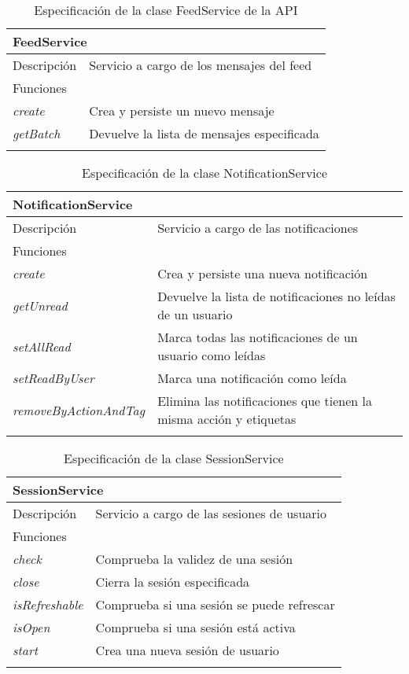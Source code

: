 \begin{longtable}{|p{} p{}|}
    \hline
    \multicolumn{2}{|l|}{FeedService} \\ \hline \hline
    Descripción      & Servicio a cargo de los mensajes del feed \\ \hline
    \multicolumn{2}{|l|}{Funciones} \\
    \emph{create}  & Crea y persiste un nuevo mensaje  \\
    \emph{getBatch}  & Devuelve la lista de mensajes especificada  \\ \hline
    \caption{Especificación de la clase FeedService de la API}
    \label{class:api:feed_service}
\end{longtable}

\begin{longtable}{|p{} p{}|}
    \hline
    \multicolumn{2}{|l|}{NotificationService} \\ \hline \hline
    Descripción      & Servicio a cargo de las notificaciones \\ \hline
    \multicolumn{2}{|l|}{Funciones} \\
    \emph{create}  & Crea y persiste una nueva notificación  \\
    \emph{getUnread}  & Devuelve la lista de notificaciones no leídas de un usuario  \\
    \emph{setAllRead}  & Marca todas las notificaciones de un usuario como leídas  \\
    \emph{setReadByUser}  & Marca una notificación como leída  \\
    \emph{removeByActionAndTag}  & Elimina las notificaciones que tienen la misma acción y etiquetas  \\ \hline
    \caption{Especificación de la clase NotificationService}
    \label{class:api:notification_service}
\end{longtable}

\begin{longtable}{|p{} p{}|}
    \hline
    \multicolumn{2}{|l|}{SessionService} \\ \hline \hline
    Descripción      & Servicio a cargo de las sesiones de usuario \\ \hline
    \multicolumn{2}{|l|}{Funciones} \\
    \emph{check}  & Comprueba la validez de una sesión  \\
    \emph{close}  & Cierra la sesión especificada  \\
    \emph{isRefreshable}  & Comprueba si una sesión se puede refrescar  \\
    \emph{isOpen}  & Comprueba si una sesión está activa  \\
    \emph{start}  & Crea una nueva sesión de usuario  \\ \hline
    \caption{Especificación de la clase SessionService}
    \label{class:api:session_service}
\end{longtable}

